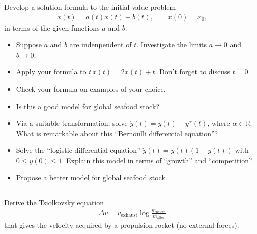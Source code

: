 \documentclass[12pt,a4paper]{article}
\begin{document}
    Develop a solution formula to
    the initial value problem
    \begin{align}
        \dot{x}(t) = a(t) x(t) + b(t)
        ,
        \qquad
        x(0) = x_0
        ,
    \end{align}
    in terms of the given functions $a$ and $b$.
    \begin{itemize}
    \item
        Suppose $a$ and $b$ are indenpendent of $t$.
        Investigate the limits $a \to 0$ and $b \to 0$.
    \item
        Apply your formula to $t \, \dot{x}(t) = 2 x(t) + t$.
        Don't forget to discuss $t = 0$.
    \item
        Check your formula on examples of your choice.
    \item
        Is this a good model for global seafood stock?
    \item
        Via a suitable transformation,
        solve 
        $\dot{y}(t) = y(t) - y^\alpha(t)$,
        where $\alpha \in \mathbb{R}$.
        What is remarkable about this 
        ``Bernoulli differential equation''?
    \item
        Solve the ``logistic differential equation''
        $\dot{y}(t) = y(t) (1 - y(t))$
        with $0 \leq y(0) \leq 1$.
        Explain this model
        in terms of ``growth'' and ``competition''.
    \item
        Propose a better model for global seafood stock.
    \end{itemize}

    
    \subsection{}
    

    Derive the Tsiolkovsky equation
    \begin{align}
        \Delta v = 
        v_\textrm{exhaust} 
        \log \frac{m_\textrm{before}}{m_\textrm{after}}
    \end{align}
    that gives the velocity acquired
    by a propulsion rocket
    (no external forces).
    

    
    
    \subsection{}
    
\end{document}
